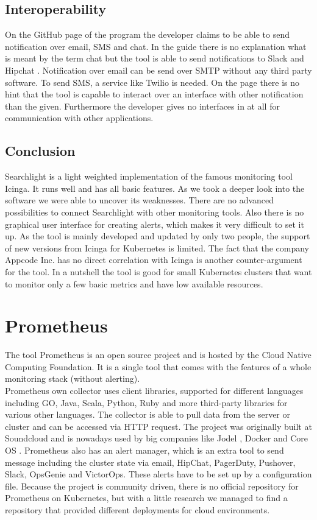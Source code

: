 \subsection{Interoperability}
On the GitHub page \cite{searchlight} of the program the developer claims to be able to send notification over email, SMS and chat.
In the guide there is no explanation what is meant by the term chat but the tool is able to send notifications to Slack \cite{slack} and Hipchat \cite{hipchat}. Notification over email can be send over SMTP without any third party software. To send SMS, a service like Twilio \cite{twilio} is needed.
On the page there is no hint that the tool is capable to interact over an interface with other notification than the given. Furthermore the developer gives no interfaces in at all for communication with other applications.
\subsection{Conclusion}
Searchlight is a light weighted  implementation of the famous monitoring tool Icinga. It runs well and has all basic features. As we took a deeper look into the software we were able to uncover its weaknesses. There are no advanced possibilities to connect Searchlight with other monitoring tools. Also there is no graphical user interface for creating alerts, which makes it very difficult to set it up. As the tool is mainly developed and updated by only two people, the support of new versions from Icinga for Kubernetes is limited. The fact that the company Appcode Inc. has no direct correlation with Icinga is another counter-argument for the tool. In a nutshell the tool is good for small Kubernetes clusters that want to monitor only a few basic metrics and have low available resources. 

\section{Prometheus}
\label{Prometheus} %
The tool Prometheus is an open source project and is hosted by the Cloud Native Computing Foundation.
It is a single tool that comes with the features of a whole monitoring stack (without alerting).\\ Prometheus own collector uses client libraries, supported for different languages including GO, Java, Scala, Python, Ruby and more third-party libraries for various other languages. The collector is able to pull data from the server or cluster and can be accessed via HTTP request.
The project was originally built at Soundcloud \cite{soundcloud} and  is nowadays used by big companies like Jodel \cite{jodel}, Docker and Core OS \cite{prometeus}.
Prometheus also has an alert manager, which is an extra tool to send message including the cluster state via email, HipChat, PagerDuty, Pushover, Slack, OpsGenie and VictorOps. These alerts have to be set up by a configuration file. 
Because the project is community driven, there is no official repository for Prometheus on Kubernetes, but with a little research we managed to find a repository \cite{prometheus_kube} that provided different deployments for cloud environments.

